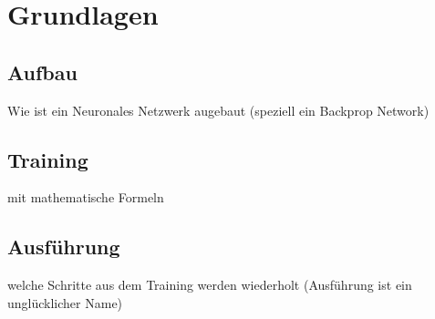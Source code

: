 \section{Grundlagen}

\subsection{Aufbau}
Wie ist ein Neuronales Netzwerk augebaut (speziell ein Backprop Network)

\subsection{Training}
mit mathematische Formeln

\subsection{Ausführung}
welche Schritte aus dem Training werden wiederholt
(Ausführung ist ein unglücklicher Name)